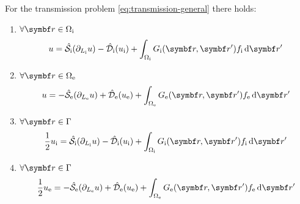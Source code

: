 \begin{lemma}
For the transmission problem \ref{eq:transmission-general} there holds:
\begin{enumerate}
\item $\forall \vect{r} \in \Omegai$
\begin{equation}
u = \bi{S}_\mathrm{i}(\partiali u)
- \bi{D}_\mathrm{i}(\ui) + \int_{\Omegai} \Gi f_\mathrm{i}\diff \vect{r}^\prime
\end{equation}
\item $\forall \vect{r} \in \Omegae$
\begin{equation}
u = -\bi{S}_\mathrm{e}(\partiale u)
+ \bi{D}_\mathrm{e}(\ue) + \int_{\Omegae}\Ge f_\mathrm{e}\diff \vect{r}^\prime
\end{equation}
\item $\forall \vect{r} \in \Gamma$
  \begin{equation}\label{eq:stat3}
    \frac{1}{2}\ui = \bi{S}_\mathrm{i}(\partiali u)
    - \bi{D}_\mathrm{i}(\ui) + \int_{\Omegai}\Gi f_\mathrm{i}\diff \vect{r}^\prime
  \end{equation}
\item $\forall \vect{r} \in \Gamma$
  \begin{equation}\label{eq:stat4}
    \frac{1}{2}\ue = -\bi{S}_\mathrm{e}(\partiale u)
    + \bi{D}_\mathrm{e}(\ue) + \int_{\Omegae}\Ge f_\mathrm{e}\diff \vect{r}^\prime
  \end{equation}
\end{enumerate}
\end{lemma}

